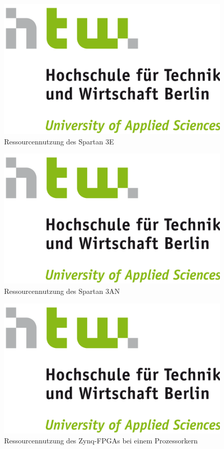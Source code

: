 \documentclass[11pt,a4paper,titlepage]{article}
\begin{document}
\begin{figure}[H]
\centering
\includegraphics[width=\textwidth]{images/htw_hochschule.png}
\caption{Ressourcennutzung des Spartan 3E}
\end{figure}

\begin{figure}[H]
\centering
\includegraphics[width=\textwidth]{images/htw_hochschule.png}
\caption{Ressourcennutzung des Spartan 3AN}
\end{figure}

\begin{figure}[H]
\centering
\includegraphics[width=\textwidth]{images/htw_hochschule.png}
\caption{Ressourcennutzung des Zynq-FPGAs bei einem Prozessorkern}
\end{figure}
\end{document}

